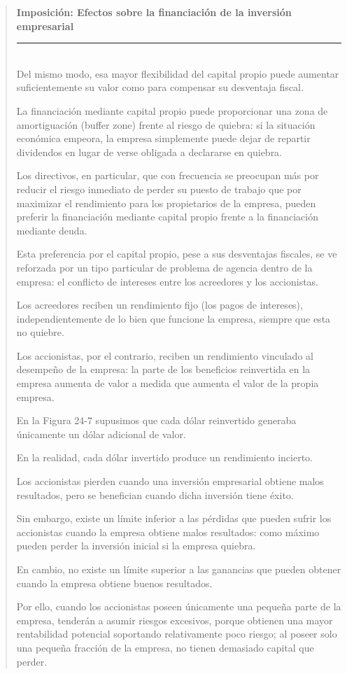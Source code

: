 \documentclass[10pt,a4paper]{article}
\newenvironment{specialblock}[1]{%
      \begin{quote} %
      \small %
      \noindent\textbf{#1}\\[-0.3em] %
      \rule{\linewidth}{0.4pt}\\[0.6em]}{
      \end{quote}}
\begin{document}
\begin{specialblock}{Imposición: Efectos sobre la financiación de la inversión empresarial}
    Del mismo modo, esa mayor flexibilidad del capital propio puede aumentar suficientemente su valor como para compensar su desventaja fiscal.
    
    La financiación mediante capital propio puede proporcionar una zona de amortiguación (buffer zone) frente al riesgo de quiebra: si la situación económica empeora, la empresa simplemente puede dejar de repartir dividendos en lugar de verse obligada a declararse en quiebra.
    
    Los directivos, en particular, que con frecuencia se preocupan más por reducir el riesgo inmediato de perder su puesto de trabajo que por maximizar el rendimiento para los propietarios de la empresa, pueden preferir la financiación mediante capital propio frente a la financiación mediante deuda.
    
    Esta preferencia por el capital propio, pese a sus desventajas fiscales, se ve reforzada por un tipo particular de problema de agencia dentro de la empresa: el conflicto de intereses entre los acreedores y los accionistas.
    
    Los acreedores reciben un rendimiento fijo (los pagos de intereses), independientemente de lo bien que funcione la empresa, siempre que esta no quiebre.
    
    Los accionistas, por el contrario, reciben un rendimiento vinculado al desempeño de la empresa: la parte de los beneficios reinvertida en la empresa aumenta de valor a medida que aumenta el valor de la propia empresa.
    
    En la Figura 24-7 supusimos que cada dólar reinvertido generaba únicamente un dólar adicional de valor.
    
    En la realidad, cada dólar invertido produce un rendimiento incierto.
    
    Los accionistas pierden cuando una inversión empresarial obtiene malos resultados, pero se benefician cuando dicha inversión tiene éxito.
    
    Sin embargo, existe un límite inferior a las pérdidas que pueden sufrir los accionistas cuando la empresa obtiene malos resultados: como máximo pueden perder la inversión inicial si la empresa quiebra.
    
    En cambio, no existe un límite superior a las ganancias que pueden obtener cuando la empresa obtiene buenos resultados.
    
    Por ello, cuando los accionistas poseen únicamente una pequeña parte de la empresa, tenderán a asumir riesgos excesivos, porque obtienen una mayor rentabilidad potencial soportando relativamente poco riesgo; al poseer solo una pequeña fracción de la empresa, no tienen demasiado capital que perder.
    

\end{specialblock}
\end{document}
